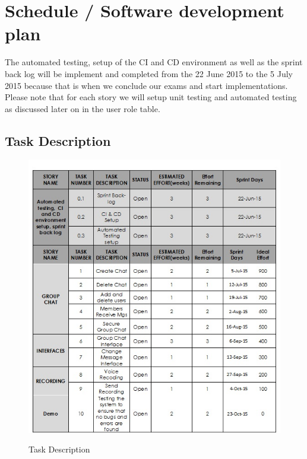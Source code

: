 \documentclass[a4paper]{article}
\begin{document}
\section{Schedule / Software development plan}
The automated testing, setup of the CI and CD environment as well as the sprint back log will be implement and completed from the 22 June 2015 to the 5 July 2015 because that is when we conclude our exams and start implementations.
Please note that for each story we will setup unit testing and automated testing as discussed later on in the user role table.

\subsection{Task Description}
\begin{figure}[H]
\includegraphics[width=1\linewidth]{./pictures/task.jpg}\\
\caption{\label{fig:Task Discription}Task Description}
\end{figure}
\end{document}
